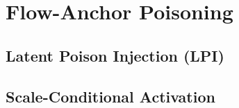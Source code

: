 \section{Flow-Anchor Poisoning}\label{sec:method}
\subsection{Latent Poison Injection (LPI)}
\subsection{Scale-Conditional Activation}
